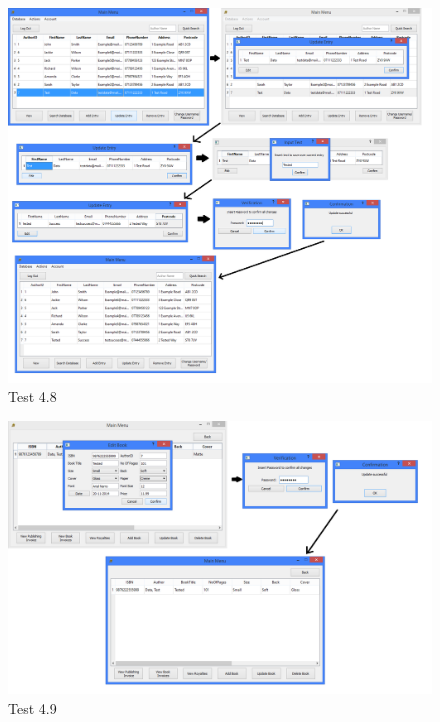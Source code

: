 \begin{landscape}
\begin{figure}[H]
    \includegraphics[width=\textwidth]{./Testing/Evidence/Series4/UpdateAuthorTest.png}
    \caption{Test 4.8}  \label{fig:UpdateAuthorTest}
\end{figure}

\begin{figure}[H]
    \includegraphics[width=\textwidth]{./Testing/Evidence/Series4/UpdateBookTest.png}
    \caption{Test 4.9}  \label{fig:UpdateBookTest}
\end{figure}


\end{landscape}
